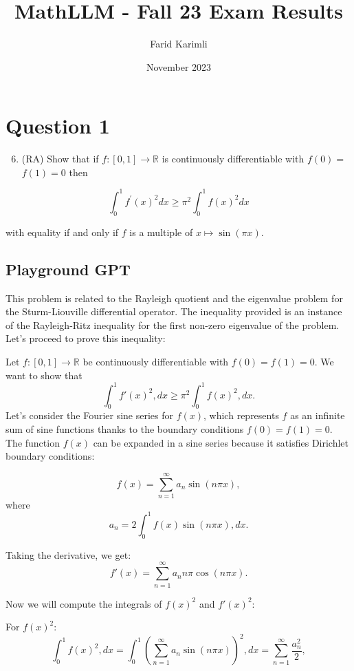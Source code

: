 \documentclass{article}
\title{MathLLM - Fall 23 Exam Results}
\author{Farid Karimli}
\date{November 2023}
\begin{document}
\maketitle

\section{Question 1}

\begin{enumerate}
  \setcounter{enumi}{5}
  \item (RA) Show that if $f:[0,1] \rightarrow \mathbb{R}$ is continuously differentiable with $f(0)=$ $f(1)=0$ then
\end{enumerate}

$$
\int_{0}^{1} f^{\prime}(x)^{2} d x \geq \pi^{2} \int_{0}^{1} f(x)^{2} d x
$$

with equality if and only if $f$ is a multiple of $x \mapsto \sin (\pi x)$.

\subsection{Playground GPT}

This problem is related to the Rayleigh quotient and the eigenvalue problem for the Sturm-Liouville differential operator. The inequality provided is an instance of the Rayleigh-Ritz inequality for the first non-zero eigenvalue of the problem. Let's proceed to prove this inequality:

Let $f : [0, 1] \to \mathbb{R}$ be continuously differentiable with $f(0) = f(1) = 0$. We want to show that $$ \int_{0}^{1} f'(x)^2 , dx \geq \pi^2 \int_{0}^{1} f(x)^2 , dx. $$ Let's consider the Fourier sine series for $f(x)$, which represents $f$ as an infinite sum of sine functions thanks to the boundary conditions $f(0) = f(1) = 0$. The function $f(x)$ can be expanded in a sine series because it satisfies Dirichlet boundary conditions:

$$ f(x) = \sum_{n=1}^\infty a_n \sin(n \pi x), $$ where $$ a_n = 2 \int_{0}^{1} f(x) \sin(n \pi x) , dx. $$

Taking the derivative, we get: $$ f'(x) = \sum_{n=1}^\infty a_n n \pi \cos(n \pi x). $$

Now we will compute the integrals of $f(x)^2$ and $f'(x)^2$:

For $f(x)^2$: $$ \int_{0}^{1} f(x)^2 , dx = \int_{0}^{1} \left(\sum_{n=1}^\infty a_n \sin(n \pi x)\right)^2 , dx = \sum_{n=1}^\infty \frac{a_n^2}{2}, $$
\end{document}
